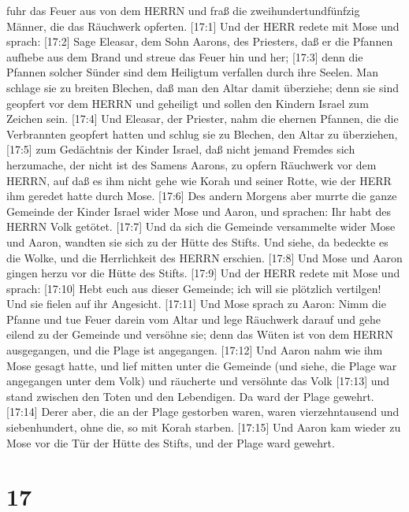 fuhr das Feuer aus von dem HERRN und fraß die zweihundertundfünfzig
Männer, die das Räuchwerk opferten.  {[}17:1{]} Und der
HERR redete mit Mose und sprach:  {[}17:2{]} Sage Eleasar,
dem Sohn Aarons, des Priesters, daß er die Pfannen aufhebe aus dem Brand
und streue das Feuer hin und her;  {[}17:3{]} denn die
Pfannen solcher Sünder sind dem Heiligtum verfallen durch ihre Seelen.
Man schlage sie zu breiten Blechen, daß man den Altar damit überziehe;
denn sie sind geopfert vor dem HERRN und geheiligt und sollen den
Kindern Israel zum Zeichen sein.  {[}17:4{]} Und Eleasar,
der Priester, nahm die ehernen Pfannen, die die Verbrannten geopfert
hatten und schlug sie zu Blechen, den Altar zu überziehen, 
{[}17:5{]} zum Gedächtnis der Kinder Israel, daß nicht jemand Fremdes
sich herzumache, der nicht ist des Samens Aarons, zu opfern Räuchwerk
vor dem HERRN, auf daß es ihm nicht gehe wie Korah und seiner Rotte, wie
der HERR ihm geredet hatte durch Mose.  {[}17:6{]} Des
andern Morgens aber murrte die ganze Gemeinde der Kinder Israel wider
Mose und Aaron, und sprachen: Ihr habt des HERRN Volk getötet.
 {[}17:7{]} Und da sich die Gemeinde versammelte wider Mose
und Aaron, wandten sie sich zu der Hütte des Stifts. Und siehe, da
bedeckte es die Wolke, und die Herrlichkeit des HERRN erschien.
 {[}17:8{]} Und Mose und Aaron gingen herzu vor die Hütte
des Stifts.  {[}17:9{]} Und der HERR redete mit Mose und
sprach:  {[}17:10{]} Hebt euch aus dieser Gemeinde; ich
will sie plötzlich vertilgen! Und sie fielen auf ihr Angesicht.
 {[}17:11{]} Und Mose sprach zu Aaron: Nimm die Pfanne und
tue Feuer darein vom Altar und lege Räuchwerk darauf und gehe eilend zu
der Gemeinde und versöhne sie; denn das Wüten ist von dem HERRN
ausgegangen, und die Plage ist angegangen.  {[}17:12{]} Und
Aaron nahm wie ihm Mose gesagt hatte, und lief mitten unter die Gemeinde
(und siehe, die Plage war angegangen unter dem Volk) und räucherte und
versöhnte das Volk  {[}17:13{]} und stand zwischen den
Toten und den Lebendigen. Da ward der Plage gewehrt. 
{[}17:14{]} Derer aber, die an der Plage gestorben waren, waren
vierzehntausend und siebenhundert, ohne die, so mit Korah starben.
 {[}17:15{]} Und Aaron kam wieder zu Mose vor die Tür der
Hütte des Stifts, und der Plage ward gewehrt.

\hypertarget{section-16}{%
\section{17}\label{section-16}}

